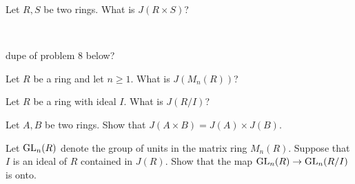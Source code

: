 \nq
\begin{exr}
	Let $R,S$ be two rings. What is $J(R\times S)$?
\end{exr} \

\begin{pf}
	dupe of problem 8 below?
\end{pf}


\nq
\begin{exr}
	Let $R$ be a ring and let $n\geq 1$. What is $J(M_n(R))$? %
\end{exr}


\nq
\begin{exr}
	Let $R$ be a ring with ideal $I$. What is $J(R/I)$? %
\end{exr}


\nq
\begin{exr}[title=Exercise 4.12B]
	Let $A,B$ be two rings. Show that $J(A\times B) = J(A)\times J(B)$. %
\end{exr}


\nq
\begin{exr}[title=Exercise 4.21] %
	Let $\operatorname{GL}_n(R)$ denote the group of units in the matrix ring $M_n(R)$.
	Suppose that $I$ is an ideal of $R$ contained in $J(R)$.
	Show that the map $\operatorname{GL}_n(R)\rightarrow \operatorname{GL}_n(R/I)$ is onto.
\end{exr}
